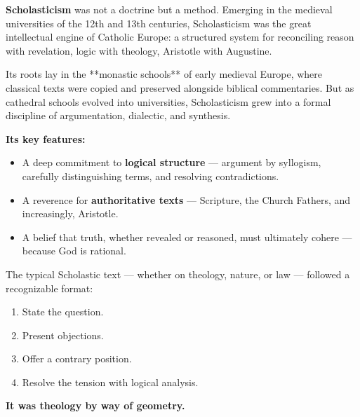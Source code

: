 \begin{tcolorbox}[colback=gray!5!white, colframe=black!75!white, title={Historical Sidebar: Scholasticism — The Logic of Faith}]

    \textbf{Scholasticism} was not a doctrine but a method. Emerging in the medieval universities of the 12th and 13th centuries, Scholasticism was the great intellectual engine of Catholic Europe: a structured system for reconciling reason with revelation, logic with theology, Aristotle with Augustine.

    \medskip
    
    Its roots lay in the **monastic schools** of early medieval Europe, where classical texts were copied and preserved alongside biblical commentaries. But as cathedral schools evolved into universities, Scholasticism grew into a formal discipline of argumentation, dialectic, and synthesis.
    
    \medskip
    
    \textbf{Its key features:}

    \medskip

    \begin{itemize}
        \item A deep commitment to \textbf{logical structure} — argument by syllogism, carefully distinguishing terms, and resolving contradictions.
        \item A reverence for \textbf{authoritative texts} — Scripture, the Church Fathers, and increasingly, Aristotle.
        \item A belief that truth, whether revealed or reasoned, must ultimately cohere — because God is rational.
    \end{itemize}

    \medskip
    
    The typical Scholastic text — whether on theology, nature, or law — followed a recognizable format:

    \medskip
    
    \begin{enumerate}
        \item State the question.
        \item Present objections.
        \item Offer a contrary position.
        \item Resolve the tension with logical analysis.
    \end{enumerate}
    
    \medskip

    \textbf{It was theology by way of geometry.}
    
    
    \end{tcolorbox}